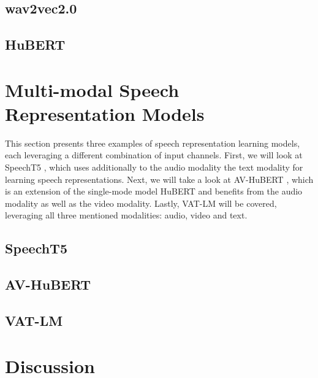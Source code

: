 \documentclass[11pt]{article}
\begin{document}
\subsection{wav2vec2.0}

\subsection{HuBERT}\label{sec:HuBERT}


\section{Multi-modal Speech Representation Models}
This section presents three examples of speech representation learning models, each leveraging a different combination of input channels. First, we will look at SpeechT5 \cite{speecht5}, which uses additionally to the audio modality the text modality for learning speech representations. Next, we will take a look at AV-HuBERT \cite{AV_HuBERT}, which is an extension of the single-mode model HuBERT \cite{hubert} and benefits from the audio modality as well as the video modality. Lastly, VAT-LM \cite{vatlm} will be covered, leveraging all three mentioned modalities: audio, video and text.
\subsection{SpeechT5}\label{sec:speecht5}

\subsection{AV-HuBERT}\label{sec:av-hubert}

\subsection{VAT-LM}

\section{Discussion}





\end{document}

